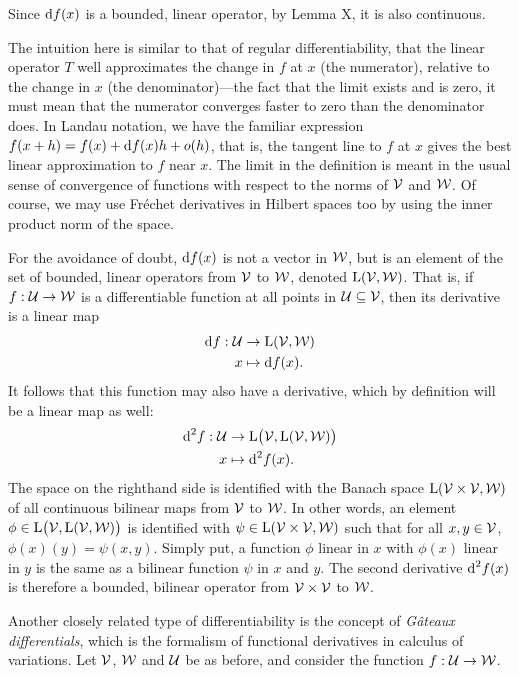 \begin{remark}
  Since $\text{d} f(x)$ is a bounded, linear operator, by Lemma X, it is also continuous. 
\end{remark}

The intuition here is similar to that of regular differentiability, that the linear operator $T$ well approximates the change in $f$ at $x$ (the numerator), relative to the change in $x$ (the denominator)---the fact that the limit exists and is zero, it must mean that the numerator converges faster to zero than the denominator does.
In Landau notation, we have the familiar expression $f(x+h) = f(x) + \text{d} f(x) h + o(h)$, that is, the tangent line to $f$ at $x$ gives the best linear approximation to $f$ near $x$.
The limit in the definition is meant in the usual sense of convergence of functions with respect to the norms of ${\mathcal V}$ and ${\mathcal W}$.
Of course, we may use Fréchet derivatives in Hilbert spaces too by using the inner product norm of the space.

For the avoidance of doubt, $\text{d} f(x)$ is not a vector in ${\mathcal W}$, but is an element of the set of bounded, linear operators from ${\mathcal V}$ to ${\mathcal W}$, denoted $\text{L}({\mathcal V},{\mathcal W})$.
That is, if $f:{\mathcal U}\to{\mathcal W}$ is a differentiable function at all points in ${\mathcal U}\subseteq{\mathcal V}$, then its derivative is a linear map
\begin{align*}
  \text{d} f: {\mathcal U} &\to \text{L}({\mathcal V},{\mathcal W}) \\
  x &\mapsto \text{d} f(x).
\end{align*}
It follows that this function may also have a derivative, which by definition will be a linear map as well:
\begin{align*}
  \text{d}^2 f: {\mathcal U} &\to \text{L}\big({\mathcal V},\text{L}({\mathcal V},{\mathcal W})\big) \\
  x &\mapsto \text{d}^2f(x).
\end{align*}
The space on the righthand side is identified with the Banach space $\text{L}({\mathcal V} \times {\mathcal V}, {\mathcal W})$ of all continuous bilinear maps from ${\mathcal V}$ to ${\mathcal W}$.
In other words, an element $\phi\in \text{L}\big({\mathcal V},\text{L}({\mathcal V},{\mathcal W})\big)$ is identified with $\psi \in \text{L}({\mathcal V} \times {\mathcal V}, {\mathcal W})$ such that for all $x,y\in{\mathcal V}$, $\phi(x)(y) = \psi(x,y)$.
Simply put, a function $\phi$ linear in $x$ with $\phi(x)$ linear in $y$ is the same as a bilinear function $\psi$ in $x$ and $y$.
The second derivative $\text{d}^2 f(x)$ is therefore a bounded, bilinear operator from ${\mathcal V}\times{\mathcal V}$ to ${\mathcal W}$.

Another closely related type of differentiability is the concept of \emph{Gâteaux differentials}, which is the formalism of functional derivatives in calculus of variations.
Let ${\mathcal V}$, ${\mathcal W}$ and ${\mathcal U}$ be as before, and consider the function $f:{\mathcal U}\to{\mathcal W}$.

